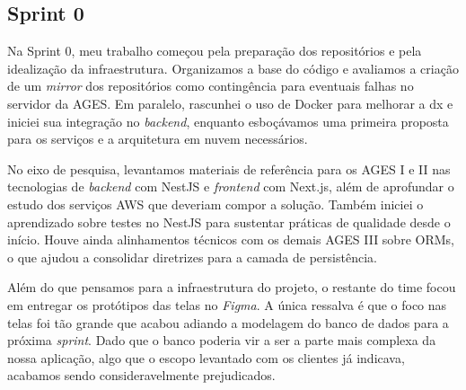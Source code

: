 \subsection{Sprint 0}

Na Sprint 0, meu trabalho começou pela preparação dos repositórios e pela idealização da infraestrutura. Organizamos a base do código e avaliamos a criação de um \textit{mirror} dos repositórios como contingência para eventuais falhas no servidor da AGES. Em paralelo, rascunhei o uso de Docker para melhorar a \ac{dx} e iniciei sua integração no \textit{backend}, enquanto esboçávamos uma primeira proposta para os serviços e a arquitetura em nuvem necessários.

No eixo de pesquisa, levantamos materiais de referência para os AGES I e II nas tecnologias de \textit{backend} com NestJS e \textit{frontend} com Next.js, além de aprofundar o estudo dos serviços AWS que deveriam compor a solução. Também iniciei o aprendizado sobre testes no NestJS para sustentar práticas de qualidade desde o início. Houve ainda alinhamentos técnicos com os demais AGES III sobre ORMs, o que ajudou a consolidar diretrizes para a camada de persistência.

Além do que pensamos para a infraestrutura do projeto, o restante do time focou em entregar os protótipos das telas no \textit{Figma}. A única ressalva é que o foco nas telas foi tão grande que acabou adiando a modelagem do banco de dados para a próxima \textit{sprint}. Dado que o banco poderia vir a ser a parte mais complexa da nossa aplicação, algo que o escopo levantado com os clientes já indicava, acabamos sendo consideravelmente prejudicados.
\\

\noindent{}
